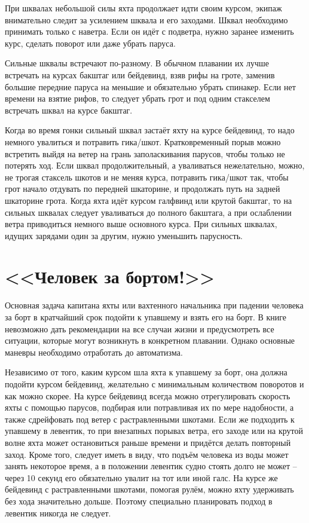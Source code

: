 При шквалах небольшой силы яхта продолжает идти своим курсом, экипаж
внимательно следит за усилением шквала и его заходами. Шквал
необходимо принимать только с наветра. Если он идёт с подветра, нужно
заранее изменить курс, сделать поворот или даже убрать паруса.

Сильные шквалы встречают по-разному. В обычном плавании их лучше
встречать на курсах бакштаг или бейдевинд, взяв рифы на гроте, заменив
большие передние паруса на меньшие и обязательно убрать спинакер. Если
нет времени на взятие рифов, то следует убрать грот и под одним
стакселем встречать шквал на курсе бакштаг.

Когда во время гонки сильный шквал застаёт яхту на курсе бейдевинд, то
надо немного увалиться и потравить гика\-/шкот. Кратковременный порыв
можно встретить выйдя на ветер на грань заполаскивания парусов, чтобы
только не потерять ход. Если шквал продолжительный, а уваливаться
нежелательно, можно, не трогая стаксель шкотов и не меняя курса,
потравить гика\-/шкот так, чтобы грот начало отдувать по передней
шкаторине, и продолжать путь на задней шкаторине грота. Когда яхта
идёт курсом галфвинд или крутой бакштаг, то на сильных шквалах следует
уваливаться до полного бакштага, а при ослаблении ветра приводиться
немного выше основного курса. При сильных шквалах, идущих зарядами
один за другим, нужно уменьшить парусность.

\section{<<Человек за бортом!>>}

Основная задача капитана яхты или вахтенного начальника при падении
человека за борт в кратчайший срок подойти к упавшему и взять его на
борт. В книге невозможно дать рекомендации на все случаи жизни и
предусмотреть все ситуации, которые могут возникнуть в конкретном
плавании. Однако основные маневры необходимо отработать до
автоматизма.

Независимо от того, каким курсом шла яхта к упавшему за борт, она
должна подойти курсом бейдевинд, желательно с минимальным количеством
поворотов и как можно скорее. На курсе бейдевинд всегда можно
отрегулировать скорость яхты с помощью парусов, подбирая или
потравливая их по мере надобности, а также сдрейфовать под ветер с
растравленными шкотами. Если же подходить к упавшему в левентик, то
при внезапных порывах ветра, его заходе или на крутой волне яхта может
остановиться раньше времени и придётся делать повторный заход. Кроме
того, следует иметь в виду, что подъём человека из воды может занять
некоторое время, а в положении левентик судно стоять долго не может
\--- через 10 секунд его обязательно увалит на тот или иной
галс. На курсе же бейдевинд с растравленными шкотами, помогая рулём,
можно яхту удерживать без хода значительно дольше. Поэтому специально
планировать подход в левентик никогда не следует.


